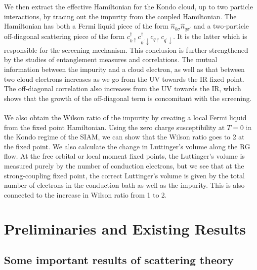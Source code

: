 \documentclass[twoside]{report}
\numberwithin{equation}{section}
\begin{document}
\\\\We then extract the effective Hamiltonian for the Kondo cloud, up to two particle interactions, by tracing out the impurity from the coupled Hamiltonian. The Hamiltonian has both a Fermi liquid piece of the form \(\hat n_{k\sigma}\hat n_{q\sigma^\prime}\) and a two-particle off-diagonal scattering piece of the form \(c^\dagger_{k \uparrow}c^\dagger_{k^\prime \downarrow}c_{q \uparrow}c_{q^\prime \downarrow}\). It is the latter which is responsible for the screening mechanism. This conclusion is further strengthened by the studies of entanglement measures and correlations. The mutual information between the impurity and a cloud electron, as well as that between two cloud electrons increases as we go from the UV towards the IR fixed point. The off-diagonal correlation also increases from the UV towards the IR, which shows that the growth of the off-diagonal term is concomitant with the screening.
\\\\We also obtain the Wilson ratio of the impurity by creating a local Fermi liquid from the fixed point Hamiltonian. Using the zero charge susceptibility at \(T=0\) in the Kondo regime of the SIAM, we can show that the Wilson ratio goes to 2 at the fixed point. We also calculate the change in Luttinger's volume along the RG flow. At the free orbital or local moment fixed points, the Luttinger's volume is measured purely by the number of conduction electrons, but we see that at the strong-coupling fixed point, the correct Luttinger's volume is given by the total number of electrons in the conduction bath as well as the impurity. This is also connected to the increase in Wilson ratio from 1 to 2.
\chapter{Preliminaries and Existing Results}\label{prelims}
\section{Some important results of scattering theory}
\end{document}
